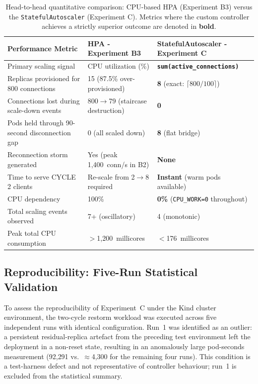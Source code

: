 \documentclass[twocolumn]{svjour3}
\begin{document}
\begin{table}[t]
\centering
\caption{Head-to-head quantitative comparison: CPU-based HPA (Experiment B3) versus the \texttt{StatefulAutoscaler} (Experiment C). Metrics where the custom controller achieves a strictly superior outcome are denoted in \textbf{bold}.}
\label{tab:head_to_head}
\begin{tabular}{@{}p{4.5cm}p{4.5cm}p{4.5cm}@{}}
\toprule
\rowcolor{gray!12}
\textbf{Performance Metric} & \textbf{HPA - Experiment B3} & \textbf{StatefulAutoscaler - Experiment C} \\
\midrule
Primary scaling signal & CPU utilization (\%) & \textbf{\texttt{sum(active\_connections)}} \\
Replicas provisioned for 800 connections & 15 (87.5\% over-provisioned) & \textbf{8} (exact: $\lceil800/100\rceil$) \\
Connections lost during scale-down events & 800$\rightarrow$79 (staircase destruction) & \textbf{0} \\
Pods held through 90-second disconnection gap & 0 (all scaled down) & \textbf{8} (flat bridge) \\
Reconnection storm generated & Yes (peak 1,400~conn/s in B2) & \textbf{None} \\
Time to serve CYCLE 2 clients & Re-scale from 2$\rightarrow$8 required & \textbf{Instant} (warm pods available) \\
CPU dependency & 100\% & \textbf{0\%} (\texttt{CPU\_WORK=0} throughout) \\
Total scaling events observed & 7+ (oscillatory) & 4 (monotonic) \\
Peak total CPU consumption & $>$1,200~millicores & $<$176~millicores \\
\bottomrule
\end{tabular}
\end{table}

\subsection{Reproducibility: Five-Run Statistical Validation}
\label{sec:exp_c_multi}

To assess the reproducibility of Experiment~C under the Kind cluster environment, the two-cycle restorm workload was executed across five independent runs with identical configuration.  Run~1 was identified as an outlier: a persistent residual-replica artefact from the preceding test environment left the deployment in a non-reset state, resulting in an anomalously large pod-seconds measurement (92{,}291 vs.\ $\approx$4{,}300 for the remaining four runs).  This condition is a test-harness defect and not representative of controller behaviour; run~1 is excluded from the statistical summary.
\end{document}
